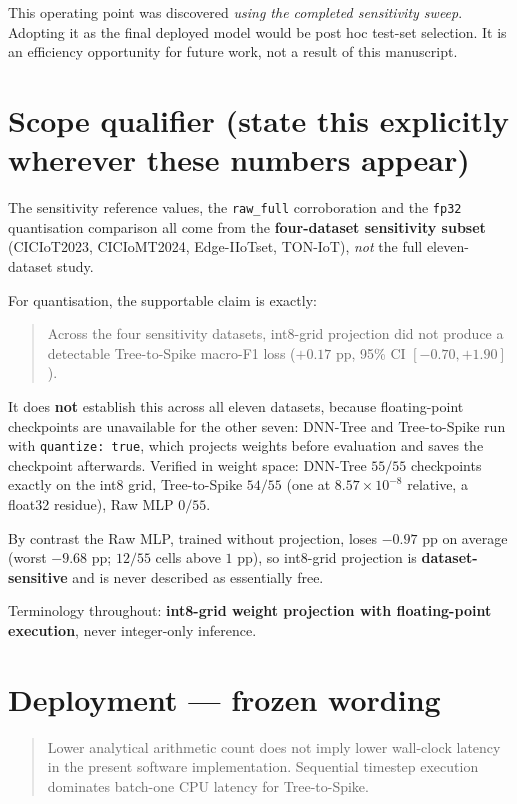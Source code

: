 \noindent This operating point was discovered \emph{using the completed sensitivity
sweep}. Adopting it as the final deployed model would be post hoc test-set selection.
It is an efficiency opportunity for future work, not a result of this manuscript.

\section*{Scope qualifier (state this explicitly wherever these numbers appear)}

The sensitivity reference values, the \texttt{raw\_full} corroboration and the
\texttt{fp32} quantisation comparison all come from the \textbf{four-dataset
sensitivity subset} (CICIoT2023, CICIoMT2024, Edge-IIoTset, TON-IoT), \emph{not} the
full eleven-dataset study.

For quantisation, the supportable claim is exactly:
\begin{quote}
Across the four sensitivity datasets, int8-grid projection did not produce a
detectable Tree-to-Spike macro-F1 loss ($+0.17$ pp, 95\% CI $[-0.70, +1.90]$).
\end{quote}
It does \textbf{not} establish this across all eleven datasets, because floating-point
checkpoints are unavailable for the other seven: DNN-Tree and Tree-to-Spike run with
\texttt{quantize:\,true}, which projects weights before evaluation and saves the
checkpoint afterwards. Verified in weight space: DNN-Tree $55/55$ checkpoints exactly
on the int8 grid, Tree-to-Spike $54/55$ (one at $8.57\times10^{-8}$ relative, a
float32 residue), Raw MLP $0/55$.

By contrast the Raw MLP, trained without projection, loses $-0.97$ pp on average
(worst $-9.68$ pp; $12/55$ cells above $1$ pp), so int8-grid projection is
\textbf{dataset-sensitive} and is never described as essentially free.

Terminology throughout: \textbf{int8-grid weight projection with floating-point
execution}, never integer-only inference.

\section*{Deployment --- frozen wording}

\begin{quote}
Lower analytical arithmetic count does not imply lower wall-clock latency in the
present software implementation. Sequential timestep execution dominates batch-one
CPU latency for Tree-to-Spike.
\end{quote}

